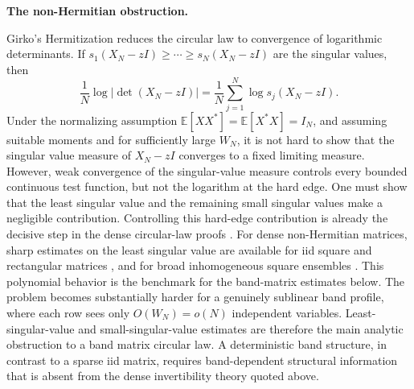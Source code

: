 \documentclass[11pt,reqno]{amsart}
\numberwithin{equation}{section}
\theoremstyle{definition}
\theoremstyle{remark}
\newcommand{\1}{\mathbf 1}
\newcommand{\introheading}[1]{%
  \par\medskip\noindent\textbf{#1.}\par\smallskip}
\begin{document}
\introheading{The non-Hermitian obstruction}
Girko's Hermitization reduces the circular law to convergence of
logarithmic determinants.  If
\(s_1(X_N-zI)\ge\cdots\ge s_N(X_N-zI)\) are the singular values, then
\begin{equation}\label{logpotentialsums}
 \frac1N\log|\det(X_N-zI)|
 =\frac1N\sum_{j=1}^N\log s_j(X_N-zI).
\end{equation}Under the normalizing assumption $\mathbb{E}[XX^*]=\mathbb{E}[X^*X]=I_N$, and assuming suitable moments and for sufficiently large $W_N$, it is not hard to show that the singular value measure of $X_N-zI$ converges to a fixed limiting measure.
However, weak convergence of the singular-value measure controls every bounded
continuous test function, but not the logarithm at the hard edge.  One
must show that the least singular value and the remaining small singular
values make a negligible contribution.  Controlling this hard-edge
contribution is already the decisive step in the dense circular-law
proofs \cite{Bai1997,GotzeTikhomirov2010,PanZhou2010,
TaoVuKrishnapur2010}.  For dense non-Hermitian matrices,
sharp estimates on the least singular value are available for iid square and rectangular matrices
\cite{RV,RVrect}, and for broad inhomogeneous square ensembles
\cite{LivshytsTikhomirovVershynin2021}.  This polynomial behavior is the
benchmark for the band-matrix estimates below.  The problem becomes
substantially harder for a genuinely sublinear band profile, where each row sees only \(O(W_N)=o(N)\)
independent variables.
Least-singular-value and small-singular-value estimates are therefore the
main analytic obstruction to a band matrix circular law.  A deterministic band
structure, in contrast to a sparse iid matrix, requires band-dependent structural information that is absent from the dense
invertibility theory quoted above.
\end{document}

